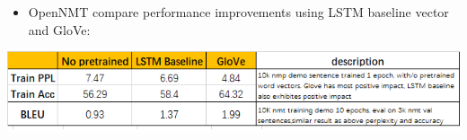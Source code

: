 \documentclass[landscape,a0paper,fontscale=0.285,table]{baposter} %
\begin{document}
\begin{poster}
{\begin{itemize}
\begin{itemize}
\item GloVe: WEB benchmark for GloVe vectors
\item Baseline glove: WEB benchmark for LSTM baseline model initialized from GloVe
\item Baseline rand: WEB benchmark for LSTM baseline model initialized randomly
\item s2s enc mean: WEB benchmark for Seq2seq model with encoder output mean as the def vec.

\end{itemize}
\item OpenNMT compare performance improvements using LSTM baseline vector and GloVe:
\end{itemize}
\begin{center}
\label{my-label}
\begin{center}
\includegraphics[width=\linewidth]{imgs/pretrained}
\end{center}
\end{center}

}

\end{poster}
\end{document}
